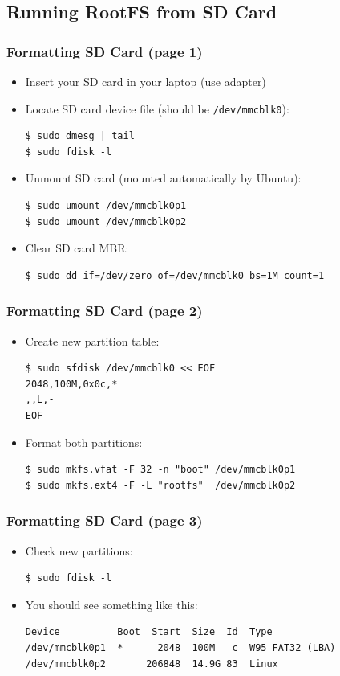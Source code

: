 \subsection{Running RootFS from SD Card}

\begin{frame}[fragile]
  \frametitle{Formatting SD Card (page 1)}
  \begin{itemize}
    \item Insert your SD card in your laptop (use adapter)
    \item Locate SD card device file (should be \texttt{/dev/mmcblk0}):
      \begin{verbatim}
$ sudo dmesg | tail
$ sudo fdisk -l
      \end{verbatim}
    \item Unmount SD card (mounted automatically by Ubuntu):
      \begin{verbatim}
$ sudo umount /dev/mmcblk0p1
$ sudo umount /dev/mmcblk0p2
      \end{verbatim}
    \item Clear SD card MBR:
      \begin{verbatim}
$ sudo dd if=/dev/zero of=/dev/mmcblk0 bs=1M count=1
      \end{verbatim}
  \end{itemize}
  \vspace*{-5mm} %
\end{frame}

\begin{frame}[fragile]
  \frametitle{Formatting SD Card (page 2)}
  \begin{itemize}
    \item Create new partition table:
      \begin{verbatim}
$ sudo sfdisk /dev/mmcblk0 << EOF
2048,100M,0x0c,*
,,L,-
EOF
      \end{verbatim}
    \item Format both partitions:
      \begin{verbatim}
$ sudo mkfs.vfat -F 32 -n "boot" /dev/mmcblk0p1
$ sudo mkfs.ext4 -F -L "rootfs"  /dev/mmcblk0p2
      \end{verbatim}
  \end{itemize}
\end{frame}

\begin{frame}[fragile]
  \frametitle{Formatting SD Card (page 3)}
  \begin{itemize}
    \item Check new partitions:
      \begin{verbatim}
$ sudo fdisk -l
      \end{verbatim}
    \item You should see something like this:
      \begin{verbatim}
Device          Boot  Start  Size  Id  Type
/dev/mmcblk0p1  *      2048  100M   c  W95 FAT32 (LBA)
/dev/mmcblk0p2       206848  14.9G 83  Linux
      \end{verbatim}
  \end{itemize}
\end{frame}

